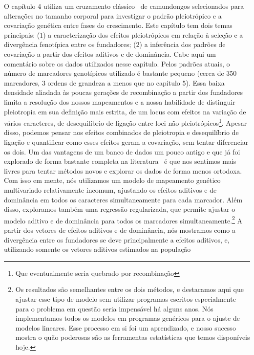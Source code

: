 \begin{refsection}
O capítulo 4 utiliza um cruzamento clássico~\parencite{Cheverud1996-fm} de
camundongos selecionados para alterações no tamanho corporal para investigar o
padrão pleiotrópico e a covariação genética entre fases do crescimento. Este
capítulo tem dois temas principais: (1) a caracterização dos efeitos
pleiotrópicos em relação à seleção e a divergência fenotípica entre os
fundadores; (2) a inferência dos padrões de covariação a partir dos efeitos
aditivos e de dominância. Cabe aqui um comentário sobre os dados utilizados
nesse capítulo. Pelos padrões atuais, o número de marcadores genotípicos
utilizado é bastante pequeno (cerca de 350 marcadores, 3 ordens de grandeza a
menos que no capítulo 5). Essa baixa densidade aliadada às poucas gerações de
recombinação a partir dos fundadores limita a resolução dos nossos mapeamentos
e a nossa habilidade de distinguir pleiotropia em sua definição mais estrita,
de um locus com efeitos na variação de vários caracteres, de desequilíbrio de
ligação entre loci não pleiotrópicos\footnote{Que eventualmente seria quebrado
por recombinação}. Apesar disso, podemos pensar nos efeitos combinados de
pleiotropia e desequilíbrio de ligação e quantificar como esses efeitos geram
a covariação, sem tentar diferenciar os dois. Um das vantagens de um banco de
dados um pouco antigo e que já foi explorado de forma bastante completa na
literatura~\parencite{Cheverud1996-fm, Kramer1998-cc, Hager2009-mz,
Vaughn1999-wt, Leamy2002-nh, Wolf2006-xt, Wolf2005-nr, Mitteroecker2016-vq} é
que nos sentimos mais livres para tentar métodos novos e explorar os dados de
forma menos ortodoxa. Com isso em mente, nós utilizamos um modelo de
mapeamento genético multivariado relativamente incomum, ajustando os efeitos
aditivos e de dominância em todos os caracteres simultaneamente para cada
marcador. Além disso, exploramos também uma regressão regularizada, que
permite ajustar o modelo aditivo e de dominância para todos os marcadores
simultaneamente.\footnote{Os resultados são semelhantes entre os dois métodos,
e destacamos aqui que ajustar esse tipo de modelo sem utilizar programas
escritos especialmente para o problema em questão seria impensável há alguns
anos. Nós implementamos todos os modelos em programas genéricos para o ajuste
de modelos lineares. Esse processo em si foi um aprendizado, e nosso sucesso
mostra o quão poderosas são as ferramentas estatísticas que temos disponíveis
hoje.} A partir dos vetores de efeitos aditivos e de dominância, nós mostramos
como a divergência entre os fundadores se deve principalmente a efeitos
aditivos, e, utilizando somente os vetores aditivos estimados na população

\end{refsection}
